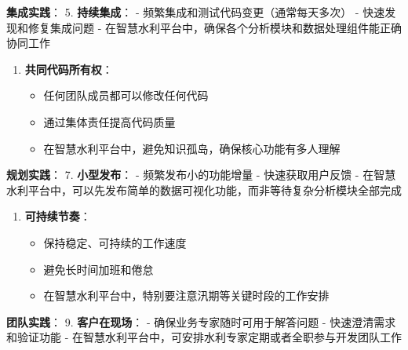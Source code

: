 \textbf{集成实践}： 5. \textbf{持续集成}： -
频繁集成和测试代码变更（通常每天多次） - 快速发现和修复集成问题 -
在智慧水利平台中，确保各个分析模块和数据处理组件能正确协同工作

\begin{enumerate}
\def\labelenumi{\arabic{enumi}.}
\setcounter{enumi}{5}
\tightlist
\item
  \textbf{共同代码所有权}：

  \begin{itemize}
  \tightlist
  \item
    任何团队成员都可以修改任何代码
  \item
    通过集体责任提高代码质量
  \item
    在智慧水利平台中，避免知识孤岛，确保核心功能有多人理解
  \end{itemize}
\end{enumerate}

\textbf{规划实践}： 7. \textbf{小型发布}： - 频繁发布小的功能增量 -
快速获取用户反馈 -
在智慧水利平台中，可以先发布简单的数据可视化功能，而非等待复杂分析模块全部完成

\begin{enumerate}
\def\labelenumi{\arabic{enumi}.}
\setcounter{enumi}{7}
\tightlist
\item
  \textbf{可持续节奏}：

  \begin{itemize}
  \tightlist
  \item
    保持稳定、可持续的工作速度
  \item
    避免长时间加班和倦怠
  \item
    在智慧水利平台中，特别要注意汛期等关键时段的工作安排
  \end{itemize}
\end{enumerate}

\textbf{团队实践}： 9. \textbf{客户在现场}： -
确保业务专家随时可用于解答问题 - 快速澄清需求和验证功能 -
在智慧水利平台中，可安排水利专家定期或者全职参与开发团队工作

